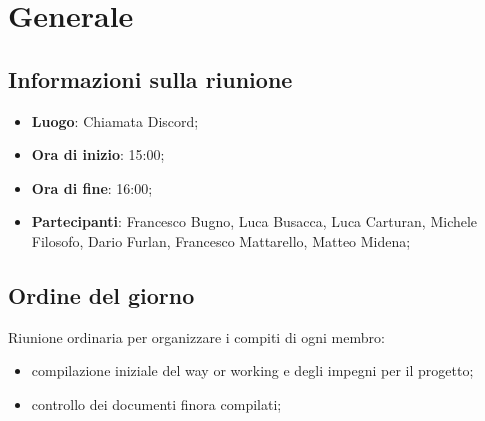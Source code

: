 \section{Generale}

\vspace{10pt}


\subsection{Informazioni sulla riunione}
\begin{itemize}
	\item \textbf{Luogo}: Chiamata Discord;
	\item \textbf{Ora di inizio}: 15:00;
	\item \textbf{Ora di fine}: 16:00;
	\item \textbf{Partecipanti}: Francesco Bugno, Luca Busacca, Luca Carturan, Michele
	Filosofo, Dario Furlan, Francesco Mattarello, Matteo Midena;
\end{itemize}

\vspace{5pt}

\subsection{Ordine del giorno}
Riunione ordinaria per organizzare i compiti di ogni membro:
\begin{itemize}
	\item compilazione iniziale del way or working e degli impegni per il progetto;
	\item controllo dei documenti finora compilati;
\end{itemize}
